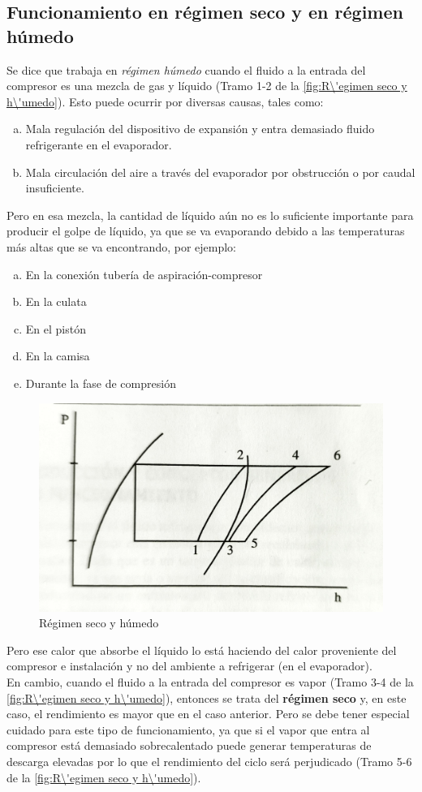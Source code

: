 \subsection{Funcionamiento en régimen seco y en régimen húmedo}
Se dice que trabaja en \textsl{r\'egimen h\'umedo} cuando el fluido a la entrada del compresor es una mezcla de gas y l\'iquido (Tramo 1-2 de la \autoref{fig:R\'egimen seco y h\'umedo}). Esto puede ocurrir por diversas causas, tales como:
\begin{enumerate}[a.]
	\item Mala regulaci\'on del dispositivo de expansi\'on y entra demasiado fluido refrigerante en el evaporador.
	\item Mala circulaci\'on del aire a trav\'es del evaporador por obstrucci\'on o por caudal insuficiente.
\end{enumerate}
Pero en esa mezcla, la cantidad de l\'iquido a\'un no es lo suficiente importante para producir el golpe de l\'iquido, ya que se va evaporando debido a las temperaturas m\'as altas que se va encontrando, por ejemplo:
\begin{enumerate}[a.]
	\item En la conexi\'on tuber\'ia de aspiraci\'on-compresor
	\item En la culata
	\item En el pist\'on
	\item En la camisa
	\item Durante la fase de compresi\'on 
\end{enumerate}

\begin{figure}
	\centering
	\includegraphics[width=.8\linewidth]{figuras/compresores/régimen seco y humedo.jpg}
	\caption{R\'egimen seco y h\'umedo}
	\label{fig:R\'egimen seco y h\'umedo}
\end{figure}

Pero ese calor que absorbe el l\'iquido lo est\'a haciendo del calor proveniente del compresor e instalaci\'on y no del ambiente a refrigerar (en el evaporador).\\ En cambio, cuando el fluido a la entrada del compresor es vapor (Tramo 3-4 de la \autoref{fig:R\'egimen seco y h\'umedo}), entonces se trata del \textbf{r\'egimen seco} y, en este caso, el rendimiento es mayor que en el caso anterior. Pero se debe tener especial cuidado para este tipo de funcionamiento, ya que si el vapor que entra al compresor est\'a demasiado sobrecalentado puede generar temperaturas de descarga elevadas por lo que el rendimiento del ciclo ser\'a perjudicado (Tramo 5-6 de la \autoref{fig:R\'egimen seco y h\'umedo}).		